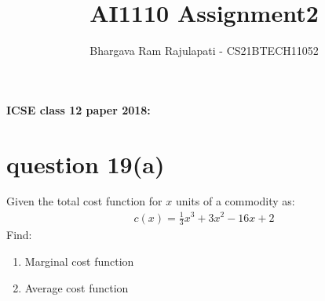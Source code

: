 \documentclass[article,12pt,twocolumn]{IEEEtran}
\title{AI1110 Assignment2}
\author{Bhargava Ram Rajulapati - CS21BTECH11052}
\begin{document}
 
 \maketitle
 \textbf{ICSE class 12 paper 2018:}
 \section*{question 19(a)} 
   Given the total cost function for $x$ units of a commodity as:
   \begin{align*}
      c(x) = \frac{1}{3}x^3 + 3x^2 - 16x +2
   \end{align*}
   Find:
   \begin{enumerate}[ label=(\roman*)]
    \item Marginal cost function
    \item Average cost function
   \end{enumerate}
   
\end{document}
